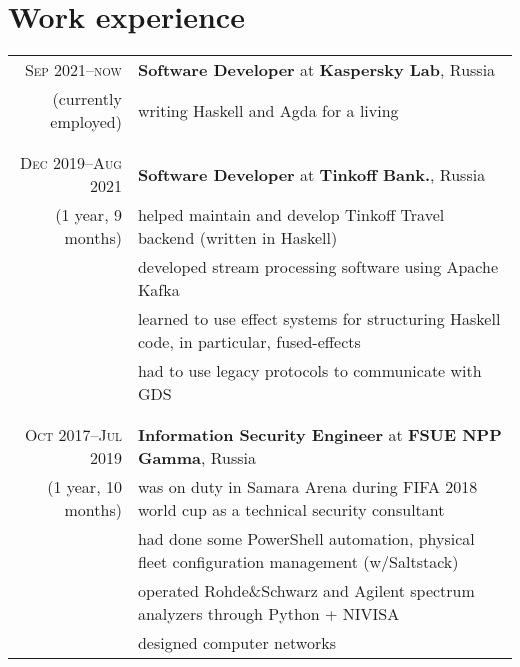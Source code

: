 \documentclass[a4paper,11pt]{article}
\begin{document}
  \pagebreak
  \section{Work experience}
    \begin{longtable}{r|p{}}
      \textsc{Sep 2021--now} & \large \sffamily \textbf{Software Developer} at \textbf{Kaspersky Lab}, Russia            \\
      \nopagebreak
      (currently employed) & writing Haskell and Agda for a living                                                       \\
      \\&\\
      \textsc{Dec 2019--Aug 2021} & \large \sffamily \textbf{Software Developer} at \textbf{Tinkoff Bank.}, Russia       \\
      \nopagebreak
      (1 year, 9 months) & helped maintain and develop Tinkoff Travel backend (written in Haskell)                       \\
                         & developed stream processing software using Apache Kafka                                       \\
                         & learned to use effect systems for structuring Haskell code, in particular, fused-effects      \\
                         & had to use legacy protocols to communicate with GDS                                           \\
      \\&\\
      \textsc{Oct 2017--Jul 2019} & \large \sffamily \textbf{Information Security Engineer} at \textbf{FSUE NPP Gamma},
                                    Russia                                                                               \\
      \nopagebreak
      (1 year, 10 months) & was on duty in Samara Arena during FIFA 2018 world cup as a technical security
                            consultant                                                                                   \\
                          & had done some PowerShell automation, physical fleet configuration management (w/Saltstack)   \\
                          & operated Rohde\&Schwarz and Agilent spectrum analyzers through Python + NIVISA               \\
                          & designed computer networks                                                                   \\

\end{longtable}
\end{document}

